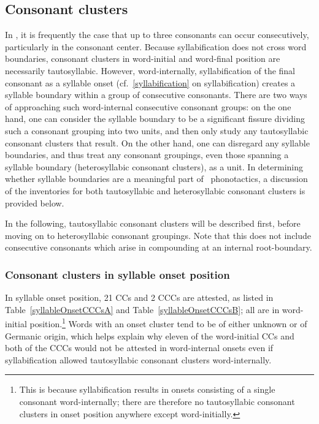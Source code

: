 \subsection{Consonant clusters}\label{CClusters}
In \PS, it is frequently the case that up to three consonants can occur consecutively, particularly in the consonant center. Because syllabification does not cross word boundaries, consonant clusters in word-initial and word-final position are necessarily tautosyllabic. However, word-internally, syllabification of the final consonant as a syllable onset (cf.~\SEC\ref{syllabification} on syllabification) creates a syllable boundary within a group of consecutive consonants. There are two ways of approaching such word-internal consecutive consonant groups: on the one hand, one can consider the syllable boundary to be a significant fissure dividing such a consonant grouping into two units, and then only study any tautosyllabic consonant clusters that result. On the other hand, one can disregard any syllable boundaries, and thus treat any consonant groupings, even those spanning a syllable boundary (heterosyllabic consonant clusters), as a unit. 
In determining whether syllable boundaries are a meaningful part of \PS\ phonotactics, a discussion of the inventories for both tautosyllabic and heterosyllabic consonant clusters is provided below. 

In the following, tautosyllabic consonant clusters will be described first, before moving on to heterosyllabic consonant groupings. Note that this does not include consecutive consonants which arise in compounding at an internal root-boundary.


\subsubsection[CCs in onset position]{Consonant clusters in syllable onset position}
In syllable onset position, 21 CCs and 2 CCCs are attested, as listed in Table~\ref{syllableOnsetCCCsA} and Table~\vref{syllableOnsetCCCsB}; %
all are in word-initial position.\footnote{This is because syllabification results in onsets consisting of a single consonant word-internally; there are therefore no tautosyllabic consonant clusters in onset position anywhere except word-initially.} 
Words with an onset cluster tend to be of either unknown or of Germanic origin, %
which helps explain why eleven of the word-initial CCs and both of the CCCs would not be attested in word-internal onsets even if syllabification allowed tautosyllabic consonant clusters word-internally. %

